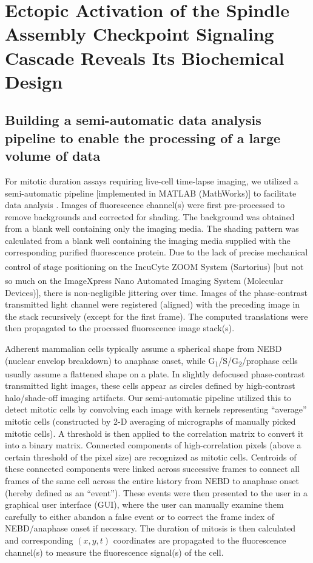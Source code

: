 \chapter{Ectopic Activation of the Spindle Assembly Checkpoint Signaling Cascade Reveals Its Biochemical Design}
\label{chpt:2}

\section{Building a semi-automatic data analysis pipeline to enable the processing of a large volume of data}
For mitotic duration assays requiring live-cell time-lapse imaging, we utilized a semi-automatic pipeline [implemented in MATLAB (MathWorks)] to facilitate data analysis . Images of fluorescence channel(s) were first pre-processed to remove backgrounds and corrected for shading. The background was obtained from a blank well containing only the imaging media. The shading pattern was calculated from a blank well containing the imaging media supplied with the corresponding purified fluorescence protein. Due to the lack of precise mechanical control of stage positioning on the IncuCyte\textsuperscript{\textregistered} ZOOM System (Sartorius) [but not so much on the ImageXpress\textsuperscript{\textregistered} Nano Automated Imaging System (Molecular Devices)], there is non-negligible jittering over time. Images of the phase-contrast transmitted light channel were registered (aligned) with the preceding image in the stack recursively (except for the first frame). The computed translations were then propagated to the processed fluorescence image stack(s).

Adherent mammalian cells typically assume a spherical shape from NEBD (nuclear envelop breakdown) to anaphase onset, while G\textsubscript{1}/S/G\textsubscript{2}/prophase cells usually assume a flattened shape on a plate. In slightly defocused phase-contrast transmitted light images, these cells appear as circles defined by high-contrast halo/shade-off imaging artifacts. Our semi-automatic pipeline utilized this to detect mitotic cells by convolving each image with kernels representing ``average'' mitotic cells (constructed by 2-D averaging of micrographs of manually picked mitotic cells). A threshold is then applied to the correlation matrix to convert it into a binary matrix. Connected components of high-correlation pixels (above a certain threshold of the pixel size) are recognized as mitotic cells. Centroids of these connected components were linked across successive frames to connect all frames of the same cell across the entire history from NEBD to anaphase onset (hereby defined as an ``event''). These events were then presented to the user in a graphical user interface (GUI), where the user can manually examine them carefully to either abandon a false event or to correct the frame index of NEBD/anaphase onset if necessary. The duration of mitosis is then calculated and corresponding $(x, y, t)$ coordinates are propagated to the fluorescence channel(s) to measure the fluorescence signal(s) of the cell.

